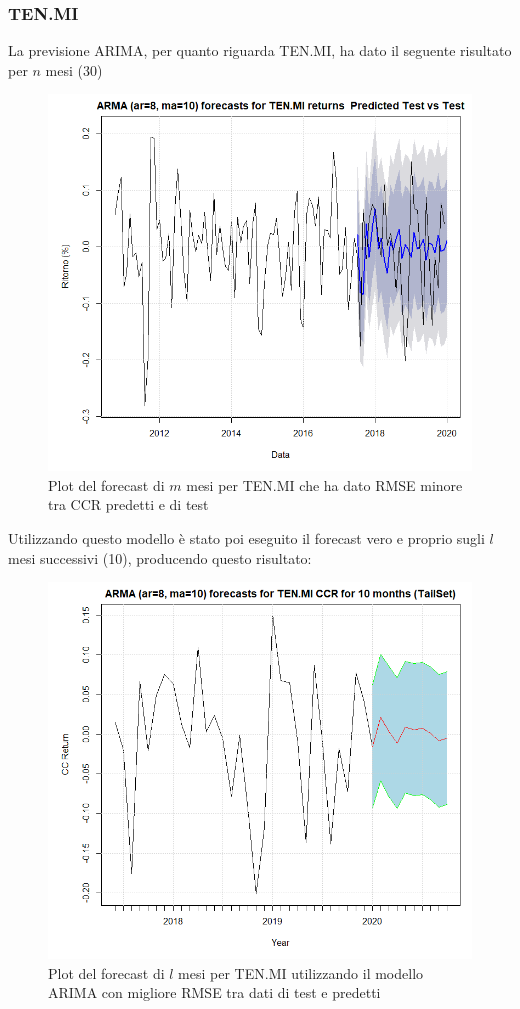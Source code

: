 \documentclass[12pt]{article}
\begin{document}
\subsubsection{TEN.MI}
La previsione ARIMA, per quanto riguarda TEN.MI, ha dato il seguente risultato per $n$ mesi (30)
\begin{figure}[!htb]
    \centering
    \includegraphics[width=1\textwidth]{immagini/tenmiforecast.png}
    \caption{Plot del forecast di $m$ mesi per TEN.MI che ha dato RMSE minore tra CCR predetti e di test}
\end{figure}
\FloatBarrier
Utilizzando questo modello è stato poi eseguito il forecast vero e proprio sugli $l$ mesi successivi (10), producendo questo risultato:
\begin{figure}[!htb]
    \centering
    \includegraphics[width=1\textwidth]{immagini/tenmiL.png}
    \caption{Plot del forecast di $l$ mesi per TEN.MI utilizzando il modello ARIMA con migliore RMSE tra dati di test e predetti}
\end{figure}
\end{document}
